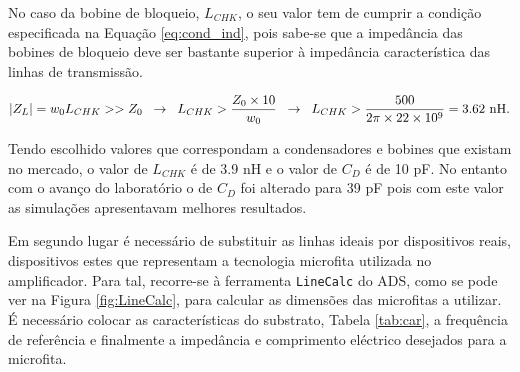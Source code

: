 \documentclass[11pt]{article}
\numberwithin{equation}{section}
\begin{document}
\vspace{1mm}
No caso da bobine de bloqueio, $L_{CHK}$, o seu valor tem de cumprir a condição especificada na Equação \ref{eq:cond_ind}, pois sabe-se que a impedância das bobines de bloqueio deve ser bastante superior à impedância característica das linhas de transmissão.  

\vspace{-3mm}
\begin{equation}
\lvert Z_L \rvert = w_{0} L_{CHK} >> Z_0 \hspace{2mm} \rightarrow \hspace{2mm} L_{CHK} > \frac{Z_0 \times 10}{w_{0}} \hspace{2mm} \rightarrow \hspace{2mm} L_{CHK} > \frac{500}{2 \pi \times 22 \times 10^{9}} = 3.62~\text{nH}.
\label{eq:cond_ind}
\end{equation}

\vspace{1mm}
Tendo escolhido valores que correspondam a condensadores e bobines que existam no mercado, o valor de $L_{CHK}$ é de 3.9 nH e o valor de $C_{D}$ é de 10 pF. No entanto com o avanço do laboratório o de $C_{D}$ foi alterado para 39 pF pois com este valor as simulações apresentavam melhores resultados.

Em segundo lugar é necessário de substituir as linhas ideais por dispositivos reais, dispositivos estes que representam a tecnologia microfita utilizada no amplificador. Para tal, recorre-se à ferramenta \texttt{LineCalc} do ADS, como se pode ver na Figura \ref{fig:LineCalc}, para calcular as dimensões das microfitas a utilizar. É necessário colocar as características do substrato, Tabela \ref{tab:car}, a frequência de referência e finalmente a impedância e comprimento eléctrico desejados para a microfita.
\end{document}
